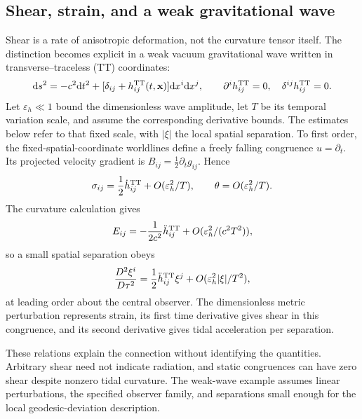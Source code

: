 \documentclass[11pt]{article}
\begin{document}
\subsection{Shear, strain, and a weak gravitational wave}
Shear is a rate of anisotropic deformation, not the curvature tensor itself. The distinction becomes explicit in a weak vacuum gravitational wave written in transverse--traceless (TT) coordinates:
\begin{equation}
\mathrm d s^2=-c^2\mathrm d t^2+
[\delta_{ij}+h^{\mathrm{TT}}_{ij}(t,\mathbf x)]\mathrm d x^i\mathrm d x^j,
\qquad \partial^i h^{\mathrm{TT}}_{ij}=0,\quad \delta^{ij}h^{\mathrm{TT}}_{ij}=0.
\label{eq:ttmetric}
\end{equation}
Let $\varepsilon_h\ll1$ bound the dimensionless wave amplitude, let $T$ be its temporal variation scale, and assume the corresponding derivative bounds. The estimates below refer to that fixed scale, with $|\xi|$ the local spatial separation. To first order, the fixed-spatial-coordinate worldlines define a freely falling congruence $u=\partial_t$. Its projected velocity gradient is
$B_{ij}=\tfrac12\partial_tg_{ij}$. Hence
\begin{equation}
\sigma_{ij}=\frac12\dot h^{\mathrm{TT}}_{ij}+O(\varepsilon_h^2/T),\qquad
\theta=O(\varepsilon_h^2/T).
\end{equation}
The curvature calculation gives
\begin{equation}
E_{ij}=-\frac{1}{2c^2}\ddot h^{\mathrm{TT}}_{ij}+O(\varepsilon_h^2/(c^2T^2)),
\end{equation}
so a small spatial separation obeys
\begin{equation}
\frac{D^2\xi^i}{D\tau^2}
=\frac12\ddot h^{\mathrm{TT}}_{ij}\xi^j+O(\varepsilon_h^2|\xi|/T^2),
\end{equation}
at leading order about the central observer. The dimensionless metric perturbation represents strain, its first time derivative gives shear in this congruence, and its second derivative gives tidal acceleration per separation.

These relations explain the connection without identifying the quantities. Arbitrary shear need not indicate radiation, and static congruences can have zero shear despite nonzero tidal curvature. The weak-wave example assumes linear perturbations, the specified observer family, and separations small enough for the local geodesic-deviation description.
\end{document}
